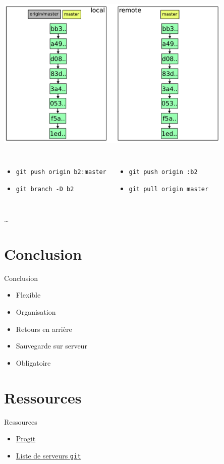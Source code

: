\documentclass{beamer}
\newcommand{\git}{\texttt{git}\xspace}
\begin{document}
\begin{frame}{}
  \centering
  \includegraphics[width=0.85\textwidth]{img/10.pdf}
  \begin{columns}
    \begin{itemize}
    \small
    \item \lstinline|git push origin b2:master|
    \item \lstinline|git branch -D b2|
    \end{itemize}
    \begin{itemize}
    \small
    \item \lstinline|git push origin :b2|
    \item \lstinline|git pull origin master|
    \end{itemize}
  \end{columns}
\end{frame}

\begin{frame}{}
  \begin{center}
  \Huge \dots
  \end{center}
\end{frame}

\section{Conclusion}
\begin{frame}{Conclusion}
\begin{itemize}
\item Flexible
\item Organisation
\item Retours en arrière
\item Sauvegarde sur serveur
\item Obligatoire
\end{itemize}
\end{frame}

\section{Ressources}
\begin{frame}{Ressources}
  \begin{itemize}
  \item \href{http://progit.org/about.html}{Progit}
  \item \href{http://git.or.cz/gitwiki/GitHosting}{Liste de serveurs \git}
  \end{itemize}
\end{frame}
\end{document}
